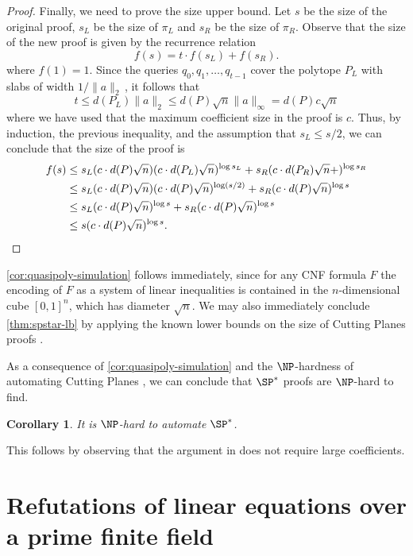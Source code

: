 \documentclass[11pt]{article}
\newtheorem{corollary}[theorem]{Corollary}
\begin{document}
\begin{proof}
	Finally, we need to prove the size upper bound. Let $s$ be the size of the original proof, $s_L$ be the size of $\pi_L$ and $s_R$ be the size of $\pi_R$. Observe that the size of the new proof is given by the recurrence relation
	\[ f(s) = t \cdot f(s_L)+f(s_R). \] 
	where $f(1) = 1$. Since the queries $q_0,q_1,\ldots, q_{t-1}$ cover the polytope $P_L$ with slabs of width $1/\|a\|_2\,$, it follows that
	\[ t \leq d(P_L) \|a\|_2 \leq d(P) \sqrt{n} \|a\|_\infty =d(P)c \sqrt{n} \]
	where we have used that the maximum coefficient size in the proof is $c$. Thus, by induction, the previous inequality, and the assumption that $s_L \leq s/2$, we can conclude that the size of the proof is
	\begin{align*}
		f(s) &\leq s_L(c \cdot d(P) \sqrt{n})(c \cdot d(P_L) \sqrt{n})^{\log s_L} + s_R(c \cdot d(P_R) \sqrt{n} +)^{\log s_R} \\
		&\leq s_L(c \cdot d(P) \sqrt{n})(c \cdot d(P) \sqrt{n})^{\log (s/2)} + s_R(c \cdot d(P) \sqrt{n} )^{\log s}\\
		&\leq s_L(c \cdot d(P) \sqrt{n})^{\log s} + s_R(c \cdot d(P) \sqrt{n})^{\log s} \\
		&\leq s(c \cdot d(P) \sqrt{n})^{\log s}. \qedhere
	\end{align*}
\end{proof}

\autoref{cor:quasipoly-simulation} follows immediately, since for any CNF formula $F$ the encoding of $F$ as a system of linear inequalities is contained in the $n$-dimensional cube $[0,1]^n$, which has diameter $\sqrt{n}$. 
We may also immediately conclude \autoref{thm:spstar-lb} by applying the known lower bounds on the size of Cutting Planes proofs \cite{Pudlak97,FlemingPPR17,HrubesP17,GargGKS18}. 

As a consequence of \autoref{cor:quasipoly-simulation} and the
%
$\NP$-hardness of automating %
Cutting Planes \cite{GoosKMP20}, we can conclude that $\SP^*$ proofs
%
%
%
%
%
are $\NP$-hard to find.   %
%

\begin{corollary}
\label{cor:non-automatability} 
%
%
It is $\NP$-hard to automate $\SP^*$.   %
%
\end{corollary}
This follows by observing that the argument in \cite{GoosKMP20} does not
require large coefficients.








\section{Refutations of linear equations over a prime finite field}\label{sec:qpSPref}
\end{document}
